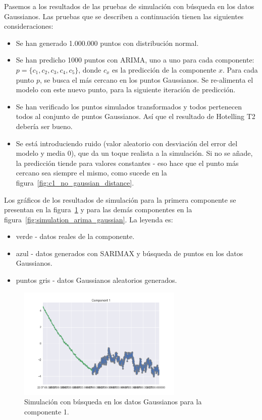 \documentclass[11pt,spanish,listoffigures,listoftables]{tfgetsinf}
\begin{document}
        Pasemos a los resultados de las pruebas de simulación con búsqueda en los datos Gaussianos. Las pruebas que se describen a continuación tienen las siguientes consideraciones:
        \begin{itemize}
        \item Se han generado 1.000.000 puntos con distribución normal.
        \item Se han predicho 1000 puntos con ARIMA, uno a uno para cada componente: \(p = \{c_{1}, c_{2}, c_{3}, c_{4}, c_{5}\}\), donde \(c_{x}\) es la predicción de la componente \(x\). Para cada punto \(p\), se busca el más cercano en los puntos Gaussianos. Se re-alimenta el modelo con este nuevo punto, para la siguiente iteración de predicción.
        \item Se han verificado los puntos simulados transformados y todos pertenecen todos al conjunto de puntos Gaussianos. Así que el resultado de Hotelling T2 debería ser bueno.
        \item Se está introduciendo ruido (valor aleatorio con desviación del error del modelo y media 0), que da un toque realista a la simulación. Si no se añade, la predicción tiende para valores constantes - eso hace que el punto más cercano sea siempre el mismo, como sucede en la figura~\ref{fig:c1_no_gaussian_distance}.
        \end{itemize}

	Los gráficos de los resultados de simulación para la primera componente se presentan en la figura~\ref{fig:c1_simulation_arima_gaussian} y para las demás componentes en la figura~\ref{fig:simulation_arima_gaussian}. La leyenda es:
	\begin{itemize}
        \item verde -  datos reales de la componente.
	\item azul - datos generados con SARIMAX y búsqueda de puntos en los datos Gaussianos.
	\item puntos gris - datos Gaussianos aleatorios generados.
	\end{itemize}

        \begin{figure}[H]
            \centering
            \includegraphics[width=0.7\textwidth]{c1_simulation_arima_gaussian.png}
            \caption{Simulación con búsqueda en los datos Gaussianos para la componente 1.}
            \label{fig:c1_simulation_arima_gaussian}
        \end{figure}
        
\end{document}

